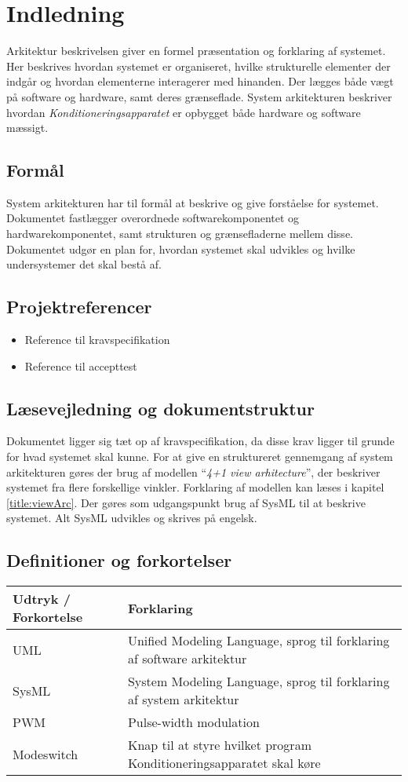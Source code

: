 	\chapter{Indledning}
	Arkitektur beskrivelsen giver en formel præsentation og forklaring af systemet. Her beskrives hvordan systemet er organiseret, hvilke strukturelle elementer der indgår og hvordan elementerne interagerer med hinanden. Der lægges både vægt på software og hardware, samt deres grænseflade. System arkitekturen beskriver hvordan \textit{Konditioneringsapparatet} er opbygget både hardware og software mæssigt.
	
	\section{Formål}
	System arkitekturen har til formål at beskrive og give forståelse for systemet. Dokumentet fastlægger overordnede softwarekomponentet og hardwarekomponentet, samt strukturen og grænsefladerne mellem disse. Dokumentet udgør en plan for, hvordan systemet skal udvikles og hvilke undersystemer det skal bestå af. 
	
	\section{Projektreferencer}
	\begin{itemize}
		\item Reference til kravspecifikation
		\item Reference til accepttest
	\end{itemize}
	
	\section{Læsevejledning og dokumentstruktur}
	Dokumentet ligger sig tæt op af kravspecifikation, da disse krav ligger til grunde for hvad systemet skal kunne. For at give en struktureret gennemgang af system arkitekturen gøres der brug af modellen “\textit{4+1 view arhitecture}”, der beskriver systemet fra flere forskellige vinkler. Forklaring af modellen kan læses i kapitel \ref{title:viewArc}. Der gøres som udgangspunkt brug af SysML til at beskrive systemet. Alt SysML udvikles og skrives på engelsk. 

	\section{Definitioner og forkortelser}
	\begin{longtable}{ |p{} |p{}| } 
		\hline
		\textbf{Udtryk / Forkortelse} &  \textbf{Forklaring} \\
		\hline
		UML & Unified Modeling Language, sprog til forklaring af software arkitektur \\
		\hline
		SysML & System Modeling Language, sprog til forklaring af system arkitektur \\
		\hline
		PWM & Pulse-width modulation \\
		\hline
		Modeswitch & Knap til at styre hvilket program Konditioneringsapparatet skal køre \\
		\hline
	\end{longtable}